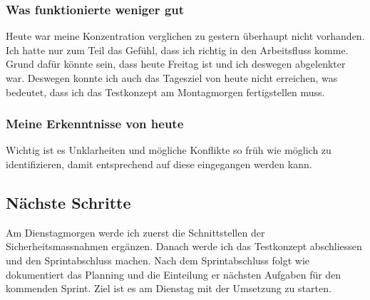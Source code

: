 \subsubsection*{Was funktionierte weniger gut}
Heute war meine Konzentration verglichen zu gestern überhaupt nicht vorhanden. Ich hatte nur zum Teil das Gefühl, dass ich richtig in den 
Arbeitsfluss komme. Grund dafür könnte sein, dass heute Freitag ist und ich deswegen abgelenkter war. Deswegen konnte ich auch das Tagesziel von heute nicht erreichen, was bedeutet,
dass ich das Testkonzept am Montagmorgen fertigstellen muss.

\subsubsection*{Meine Erkenntnisse von heute}
Wichtig ist es Unklarheiten und mögliche Konflikte so früh wie möglich zu identifizieren, damit entsprechend auf diese eingegangen werden kann.

\subsection*{Nächste Schritte}
Am Dienstagmorgen werde ich zuerst die Schnittstellen der Sicherheitsmassnahmen ergänzen. Danach werde ich das Testkonzept abschliessen und den 
Sprintabschluss machen. Nach dem Sprintabschluss folgt wie dokumentiert das Planning und die Einteilung er nächsten Aufgaben für den kommenden Sprint.
Ziel ist es am Dienstag mit der Umsetzung zu starten.

\pagebreak
